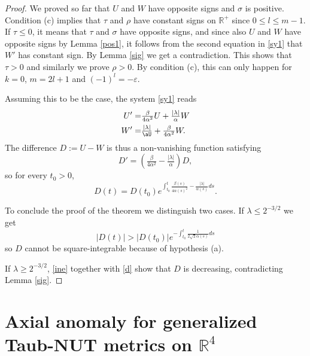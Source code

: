 \documentclass[12pt]{amsart}
\begin{document}
\begin{proof}
We proved so far that $U$ and $W$ have opposite signs and $\sigma$ is positive.
Condition (c) implies that $\tau$ and $\rho$ have constant signs on ${{\mathbb R}}^+$
since $0\leq l\leq m-1$. If $\tau\leq 0$, 
it means that $\tau$ and $\sigma$ have opposite signs, and since also $U$ and $W$ 
have opposite signs by Lemma \ref{pos1}, it follows from the second equation 
in \eqref{sy1} that $W'$ has constant sign. By Lemma \ref{sig} we get 
a contradiction. This shows that $\tau>0$ and similarly we prove $\rho>0$. 
By condition (c), this can only happen for $k=0$, $m=2l+1$ and $(-1)^l=-{\varepsilon}$. 

Assuming this to be the case, the system \eqref{sy1} reads
\begin{equation}\label{sy2}\begin{split}
 U'=&\tfrac{\beta}{4{\alpha}^2} U+\tfrac{|\lambda|}{\alpha} W\\ 
 W'=&\tfrac{|\lambda|}\aU+\tfrac{\beta}{4{\alpha}^2}W.
\end{split}
\end{equation}
The difference $D:=U-W$ is thus a non-vanishing function satisfying 
\begin{equation}\label{d}D'=\left(\tfrac{\beta}{4{\alpha}^2}-\tfrac{|\lambda|}{\alpha}\right)D,\end{equation}
so for every $t_0>0$,
\[D(t)=D(t_0)e^{\int_{t_0}^t\frac{{\beta}(s)}{4{\alpha}(s)^2}-
\frac{|\lambda|}{{\alpha}(s)}ds}.\]

To conclude the proof of the theorem we distinguish two cases. If $\lambda\le 2^{-3/2}$ we get
$$|D(t)|> |D(t_0)|e^{-\int_{t_0}^t\frac{1}{2\sqrt 2{\alpha}(s)}ds}$$
so $D$ cannot be square-integrable because of hypothesis (a).

If $\lambda\ge 2^{-3/2}$, \eqref{ine} together with \eqref{d} show that 
$D$ is decreasing, contradicting Lemma \ref{sig}.
\end{proof}

\section{Axial anomaly for generalized Taub-NUT metrics on ${{\mathbb R}}^4$}
\label{sectap}
\end{document}
